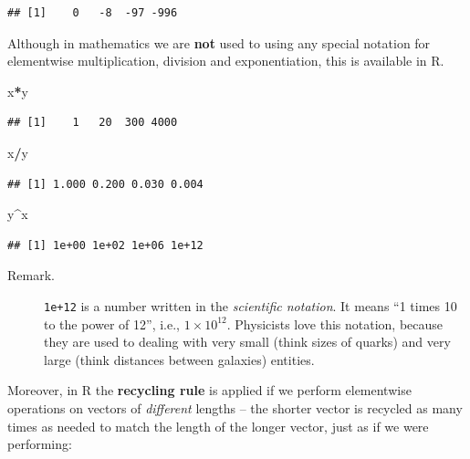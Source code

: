 \documentclass[10pt,b5paper,krantz1]{krantz}
\newenvironment{Shaded}{\begin{snugshade}}{\end{snugshade}}
\newcommand{\NormalTok}[1]{#1}
\newcommand{\OperatorTok}[1]{\textcolor[rgb]{0.43,0.43,0.43}{\textbf{#1}}}
\begin{document}
\begin{verbatim}
## [1]    0   -8  -97 -996
\end{verbatim}

Although in mathematics we are \textbf{not} used to using any special notation
for elementwise multiplication, division and exponentiation, this is available in R.

\begin{Shaded}
\begin{Highlighting}[]
\NormalTok{x}\OperatorTok{*}\NormalTok{y}
\end{Highlighting}
\end{Shaded}

\begin{verbatim}
## [1]    1   20  300 4000
\end{verbatim}

\begin{Shaded}
\begin{Highlighting}[]
\NormalTok{x}\OperatorTok{/}\NormalTok{y}
\end{Highlighting}
\end{Shaded}

\begin{verbatim}
## [1] 1.000 0.200 0.030 0.004
\end{verbatim}

\begin{Shaded}
\begin{Highlighting}[]
\NormalTok{y}\OperatorTok{^}\NormalTok{x}
\end{Highlighting}
\end{Shaded}

\begin{verbatim}
## [1] 1e+00 1e+02 1e+06 1e+12
\end{verbatim}

\begin{description}
\item[Remark.]
\texttt{1e+12} is a number written in the \emph{scientific notation}.
It means ``1 times 10 to the power of 12'', i.e., \(1\times 10^{12}\). Physicists
love this notation, because they are used to dealing with very small (think sizes of quarks) and very large (think distances between galaxies) entities.
\end{description}

Moreover, in R the \textbf{recycling rule} is applied if we perform elementwise
operations on vectors of \emph{different} lengths -- the shorter
vector is recycled as many times as needed to match the length of the longer
vector, just as if we were performing:
\end{document}
